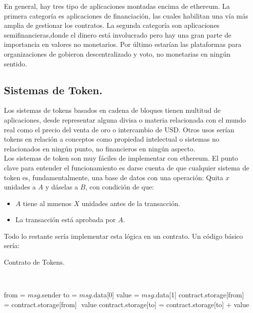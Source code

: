\documentclass[11pt,a4paper]{article}
\begin{document}
En general, hay tres tipo de aplicaciones montadas encima de ethereum. La primera categoría es aplicaciones de financiación, las cuales habilitan una vía más amplia de gestionar los contratos. La segunda categoría son aplicaciones semifinancieras,donde el dinero está involucrado pero hay una gran parte de importancia en valores no monetarios. Por último estarían las plataformas para organizaciones de gobieron descentralizado y voto, no monetarias en ningún sentido.

\subsection{Sistemas de Token.}

Los sistemas de tokens basados en cadena de bloques tienen multitud de aplicaciones, desde representar alguna divisa o materia relacionada con el mundo real como el precio del venta de oro o intercambio de USD. Otros usos serían tokens en relación a conceptos como propiedad intelectual o sistemas no relacionados en ningún punto, no financieros en ningún aspecto. \\

Los sistemas de token son muy fáciles de implementar con ethereum. El punto clave para entender el funcionamiento es darse cuenta de que cualquier sistema de token es, fundamentalmente, una base de datos con una operación: Quita $x$ unidades a $A$ y dáselas a $B$, con condición de que:
\begin{itemize}
\item $A$ tiene al mmenos $X$ unidades antes de la transacción.
\item La transacción está aprobada por $A$. 
\end{itemize}

Todo lo restante sería implementar esta lógica en un contrato. Un código básico sería:\\


\begin{algorithm}
  \caption{Contrato de Tokens.}\label{token}
  \begin{algorithmic}[1]
    			\\ 
    
    \State from = $msg$.sender
    \State to = $msg$.data[0]
    \State value = $msg$.data[1]
    \State contract.storage[from] = contract.storage[from] ­ value
    \State contract.storage[to] = contract.storage[to] + value
    \EndIf
    \EndProcedure
  \end{algorithmic}
\end{algorithm}
\end{document}
